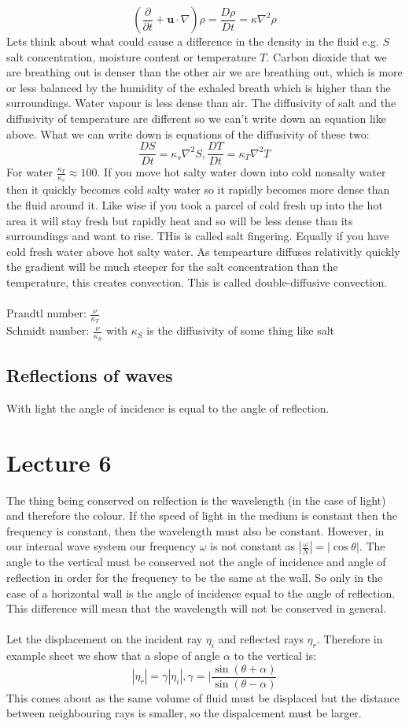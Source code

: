 \documentclass{article}
\begin{document}
$$
(\frac{\partial}{\partial t} + \bm u \cdot \nabla) \rho = \frac{D\rho}{Dt} = \kappa \nabla^2 \rho
$$
Lets think about what could cause a difference in the density in the fluid e.g. $S$ salt concentration, moisture content or temperature $T$. Carbon dioxide that we are breathing out is denser than the other air we are breathing out, which is more or less balanced by the humidity of the exhaled breath which is higher than the surroundings. Water vapour is less dense than air. The diffusivity of salt and the diffusivity of temperature are different so we can't write down an equation like above. What we can write down is equations of the diffusivity of these two:
$$
\frac{D S}{Dt} = \kappa_s \nabla^2 S, \frac{DT}{Dt} = \kappa_T \nabla^2 T
$$
For water $\frac{\kappa_T}{\kappa_s} \approx 100$. If you move hot salty water down into cold nonsalty water then it quickly becomes cold salty water so it rapidly becomes more dense than the fluid around it. Like wise if you took a parcel of cold fresh up into the hot area it will stay fresh but rapidly heat and so will be less dense than its surroundings and want to rise. THis is called salt fingering. Equally if you have cold fresh water above hot salty water. As tempearture diffuses relativitly quickly the gradient will be much steeper for the salt concentration than the temperature, this creates convection.  This is called double-diffusive convection. \\\\
Prandtl number: $\frac{\nu}{\kappa_T}$\\
Schmidt number: $\frac{\nu}{\kappa_S}$ with $\kappa_S$ is the diffusivity of some thing like salt
\subsection{Reflections of waves}
With light the angle of incidence is equal to the angle of reflection.
\section{Lecture 6}
The thing being conserved on relfection is the wavelength (in the case of light) and therefore the colour. If the speed of light in the medium is constant then the frequency is constant, then the wavelength must also be constant. However, in our internal wave system our frequency $\omega$ is not constant as $|\frac{\omega}{N} | = |\cos \theta|$. The angle to the vertical must be conserved not the angle of incidence and angle of reflection in order for the frequency to be the same at the wall. So only in the case of a horizontal wall is the angle of incidence equal to the angle of reflection.  This difference will mean that the wavelength will not be conserved in general.\\\\
Let the displacement on the incident ray $\eta_i$ and reflected rays $\eta_r$. Therefore in example sheet we show that a slope of angle $\alpha$ to the vertical is: 
$$
|\eta_r| = \gamma |\eta_i|, \gamma = |\frac{\sin(\theta + \alpha)}{\sin(\theta - \alpha)}
$$
This comes about as the same volume of fluid must be displaced but the distance between neighbouring rays is smaller, so the dispalcement must be larger.
\end{document}
